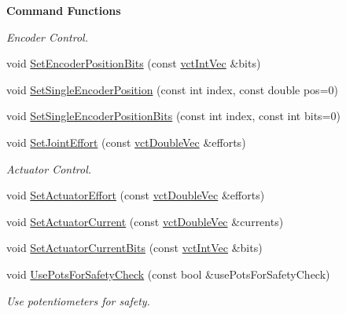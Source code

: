 \begin{Indent}{\bf Command Functions}
\begin{DoxyCompactItemize}
\begin{DoxyCompactList}\small\item\em Encoder Control. \end{DoxyCompactList}\item 
void \hyperlink{classsaw_robot_i_o1394_1_1osa_robot1394_a64b8bc6716c9e9d1be66f55618cdb6d6}{Set\+Encoder\+Position\+Bits} (const \hyperlink{vct_dynamic_vector_types_8h_a47260df0b570a25352b3f318ed0b4c4e}{vct\+Int\+Vec} \&bits)
\item 
void \hyperlink{classsaw_robot_i_o1394_1_1osa_robot1394_aed34a0863a908df33e54a828b93a8230}{Set\+Single\+Encoder\+Position} (const int index, const double pos=0)
\item 
void \hyperlink{classsaw_robot_i_o1394_1_1osa_robot1394_ab7dee648d9d063e7cc24cdc904859538}{Set\+Single\+Encoder\+Position\+Bits} (const int index, const int bits=0)
\item 
void \hyperlink{classsaw_robot_i_o1394_1_1osa_robot1394_a4a7625a56a46deac9ccb4a941cf8cda6}{Set\+Joint\+Effort} (const \hyperlink{vct_dynamic_vector_types_8h_ade4b3068c86fb88f41af2e5187e491c2}{vct\+Double\+Vec} \&efforts)
\begin{DoxyCompactList}\small\item\em Actuator Control. \end{DoxyCompactList}\item 
void \hyperlink{classsaw_robot_i_o1394_1_1osa_robot1394_a4e2c3a7ff10a61f01b31017e2542422b}{Set\+Actuator\+Effort} (const \hyperlink{vct_dynamic_vector_types_8h_ade4b3068c86fb88f41af2e5187e491c2}{vct\+Double\+Vec} \&efforts)
\item 
void \hyperlink{classsaw_robot_i_o1394_1_1osa_robot1394_a071968e765c8811d219247a9cb9cc301}{Set\+Actuator\+Current} (const \hyperlink{vct_dynamic_vector_types_8h_ade4b3068c86fb88f41af2e5187e491c2}{vct\+Double\+Vec} \&currents)
\item 
void \hyperlink{classsaw_robot_i_o1394_1_1osa_robot1394_a12573b0a6f08989503310c143ff38b11}{Set\+Actuator\+Current\+Bits} (const \hyperlink{vct_dynamic_vector_types_8h_a47260df0b570a25352b3f318ed0b4c4e}{vct\+Int\+Vec} \&bits)
\item 
void \hyperlink{classsaw_robot_i_o1394_1_1osa_robot1394_ac47f7c391fc2893c8102be62c58f1688}{Use\+Pots\+For\+Safety\+Check} (const bool \&use\+Pots\+For\+Safety\+Check)
\begin{DoxyCompactList}\small\item\em Use potentiometers for safety. \end{DoxyCompactList}\item 

\end{DoxyCompactItemize}
\end{Indent}

